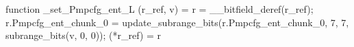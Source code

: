 function _set_Pmpcfg_ent_L (r_ref, v) = {
    r = __bitfield_deref(r_ref);
    r.Pmpcfg_ent_chunk_0 = update_subrange_bits(r.Pmpcfg_ent_chunk_0, 7, 7, subrange_bits(v, 0, 0));
    (*r_ref) = r
}
